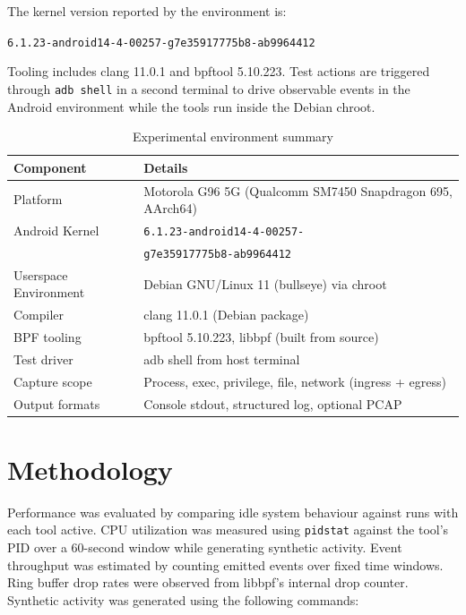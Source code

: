 \documentclass{mnitjaipur}
\begin{document}
The kernel version reported by the environment is:
\begin{center}
\small\texttt{6.1.23-android14-4-00257-g7e35917775b8-ab9964412}
\end{center}
Tooling includes clang 11.0.1 and bpftool 5.10.223. Test actions are triggered through \texttt{adb shell} in a second terminal to drive observable events in the Android environment while the tools run inside the Debian chroot.

\begin{table}[H]
  \centering
  \caption{Experimental environment summary}
  \begin{tabular}{|p{}|p{}|}
    \hline
    \textbf{Component} & \textbf{Details} \\ \hline
    Platform & Motorola G96 5G (Qualcomm SM7450 Snapdragon 695, AArch64) \\ \hline
    Android Kernel & \small\texttt{6.1.23-android14-4-00257-}\\
    & \small\texttt{g7e35917775b8-ab9964412} \\ \hline
    Userspace Environment & Debian GNU/Linux 11 (bullseye) via chroot \\ \hline
    Compiler & clang 11.0.1 (Debian package) \\ \hline
    BPF tooling & bpftool 5.10.223, libbpf (built from source) \\ \hline
    Test driver & adb shell from host terminal \\ \hline
    Capture scope & Process, exec, privilege, file, network (ingress + egress) \\ \hline
    Output formats & Console stdout, structured log, optional PCAP \\ \hline
  \end{tabular}
\end{table}

\section{Methodology}
Performance was evaluated by comparing idle system behaviour against runs with each tool active. CPU utilization was measured using \texttt{pidstat} against the tool's PID over a 60-second window while generating synthetic activity. Event throughput was estimated by counting emitted events over fixed time windows. Ring buffer drop rates were observed from libbpf's internal drop counter. Synthetic activity was generated using the following commands:
\end{document}
